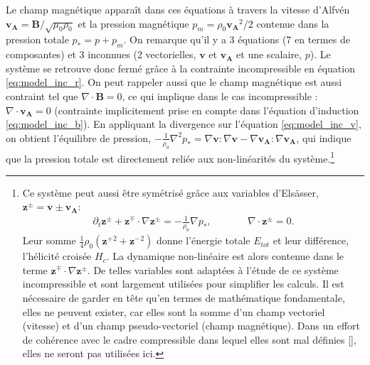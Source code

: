 Le champ magnétique apparaît dans ces équations à travers la vitesse d'Alfvén $\boldsymbol{v_A} = \boldsymbol{B}/\sqrt{\mu_0 \rho_0}$ et la pression magnétique $p_m = \rho_0 \boldsymbol{v_A}^2 /2$ contenue dans la pression totale $p_* = p + p_m$. On remarque qu'il y a 3 équations (7 en termes de composantes) et 3 inconnues (2 vectorielles, $\boldsymbol{v}$ et $\boldsymbol{v_A}$ et une scalaire, $p$). Le système se retrouve donc fermé grâce à la contrainte incompressible en équation \eqref{eq:model_inc_r}. On peut rappeler aussi que le champ magnétique est aussi contraint tel que $\nabla \cdot \boldsymbol{B} = 0$, ce qui implique dans le cas incompressible : $\nabla \cdot \boldsymbol{v_A} = 0$ (contrainte implicitement prise en compte dans l'équation d'induction \eqref{eq:model_inc_b}). En appliquant la divergence sur l'équation \eqref{eq:model_inc_v}, on obtient l'équilibre de pression, $- \frac{1}{\rho_0}\nabla^2 p_* = \nabla \boldsymbol{v} : \nabla \boldsymbol{v} -  \nabla \boldsymbol{v_A} : \nabla \boldsymbol{v_A} $, qui indique que la pression totale est directement reliée aux non-linéarités du système.\footnote{Ce système peut aussi être symétrisé grâce aux variables d'Elsässer, $\boldsymbol{z^{\pm}} = \boldsymbol{v} \pm \boldsymbol{v_A}$: 
\begin{eqnarray}
\partial_t \boldsymbol{z^{\pm}} + \boldsymbol{z^{\mp}} \cdot \nabla \boldsymbol{z^{\pm}} = - \frac{1}{\rho_0} \nabla p_* , &\qquad& \nabla \cdot \boldsymbol{z^{\pm}} = 0 .
\end{eqnarray}
Leur somme $\frac{1}{4}\rho_0 (\boldsymbol{z^{+}}{}^2 + \boldsymbol{z^{-}}{}^2)$ donne l'énergie totale $E_{tot}$ et leur différence, l'hélicité croisée  $H_c$. La dynamique non-linéaire est alors contenue dans le terme $\boldsymbol{z^{\mp}} \cdot \nabla \boldsymbol{z^{\pm}}$. De telles variables sont adaptées à l'étude de ce système incompressible et sont largement utilisées pour simplifier les calculs. Il est nécessaire de garder en tête qu'en termes de mathématique fondamentale, elles ne peuvent exister, car elles sont la somme d'un champ vectoriel (vitesse) et d'un champ pseudo-vectoriel (champ magnétique). Dans un effort de cohérence avec le cadre compressible dans lequel elles sont mal définies [\cite{magyar_nature_2019}], elles ne seront pas utilisées ici.}

